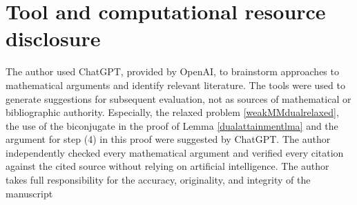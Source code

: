 \documentclass[letterpaper]{amsart}
\theoremstyle{definition}
\begin{document}
\section*{Tool and computational resource disclosure}
The author used ChatGPT, provided by OpenAI, to brainstorm approaches to mathematical arguments and identify relevant literature. The tools were used to generate suggestions for subsequent evaluation, not as sources of mathematical or bibliographic authority. Especially, the relaxed problem \eqref{weakMMdualrelaxed}, the use of the biconjugate in the proof of Lemma \ref{dualattainmentlma} and the argument for step (4) in this proof were suggested by ChatGPT.
The author independently checked every mathematical argument and verified every citation against the cited source without
relying on artificial intelligence. The author takes full responsibility for the accuracy, originality, and integrity of the manuscript



\end{document}
